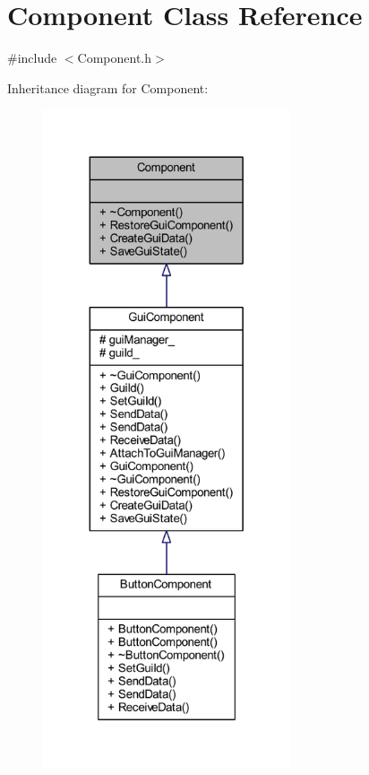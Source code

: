 \hypertarget{class_component}{}\section{Component Class Reference}
\label{class_component}


{\ttfamily \#include $<$Component.\+h$>$}



Inheritance diagram for Component\+:
\nopagebreak
\begin{figure}[H]
\begin{center}
\leavevmode
\includegraphics[height=550pt]{class_component__inherit__graph}
\end{center}
\end{figure}


